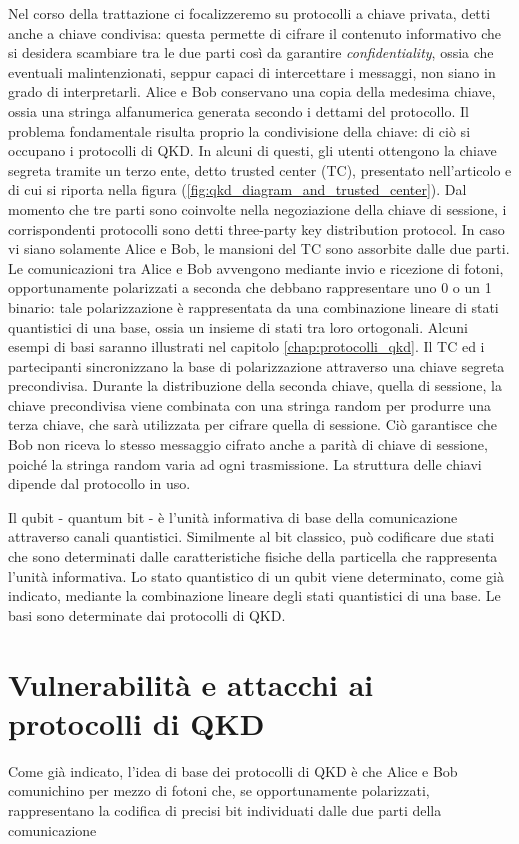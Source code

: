 Nel corso della trattazione ci focalizzeremo su protocolli a chiave privata, detti anche a chiave condivisa: questa permette di cifrare il contenuto informativo che si desidera scambiare tra le due parti così da garantire \textit{confidentiality}, ossia che eventuali malintenzionati, seppur capaci di intercettare i messaggi, non siano in grado di interpretarli. Alice e Bob conservano una copia della medesima chiave, ossia una stringa alfanumerica generata secondo i dettami del protocollo. Il problema fondamentale risulta proprio la condivisione della chiave: di ciò si occupano i protocolli di QKD.
In alcuni di questi, gli utenti ottengono la chiave segreta tramite un terzo ente, detto trusted center (TC), presentato nell'articolo \cite{security_qkdp} e di cui si riporta nella figura (\ref{fig:qkd_diagram_and_trusted_center}). Dal momento che tre parti sono coinvolte nella negoziazione della chiave di sessione, i corrispondenti protocolli sono detti three-party key distribution protocol. In caso vi siano solamente Alice e Bob, le mansioni del TC sono assorbite dalle due parti. \\
Le comunicazioni tra Alice e Bob avvengono mediante invio e ricezione di fotoni, opportunamente polarizzati a seconda che debbano rappresentare uno 0 o un 1 binario: tale polarizzazione è rappresentata da una combinazione lineare di stati quantistici di una base, ossia un insieme di stati tra loro ortogonali. Alcuni esempi di basi saranno illustrati nel capitolo \ref{chap:protocolli_qkd}.
Il TC ed i partecipanti sincronizzano la base di polarizzazione attraverso una chiave segreta precondivisa. Durante la distribuzione della seconda chiave, quella di sessione, la chiave precondivisa viene combinata con una stringa random per produrre una terza chiave, che sarà utilizzata per cifrare quella di sessione. Ciò garantisce che Bob non riceva lo stesso messaggio cifrato anche a parità di chiave di sessione, poiché la stringa random varia ad ogni trasmissione. La struttura delle chiavi dipende dal protocollo in uso.

Il qubit - quantum bit - è l'unità informativa di base della comunicazione attraverso canali quantistici. Similmente al bit classico, può codificare due stati che sono determinati dalle caratteristiche fisiche della particella che rappresenta l'unità informativa. Lo stato quantistico di un qubit viene determinato, come già indicato, mediante la combinazione lineare degli stati quantistici di una base. Le basi sono determinate dai protocolli di QKD.

\section{Vulnerabilità e attacchi ai protocolli di QKD}
Come già indicato, l'idea di base dei protocolli di QKD è che Alice e Bob comunichino per mezzo di fotoni che, se opportunamente polarizzati, rappresentano la codifica di precisi bit individuati dalle due parti della comunicazione

